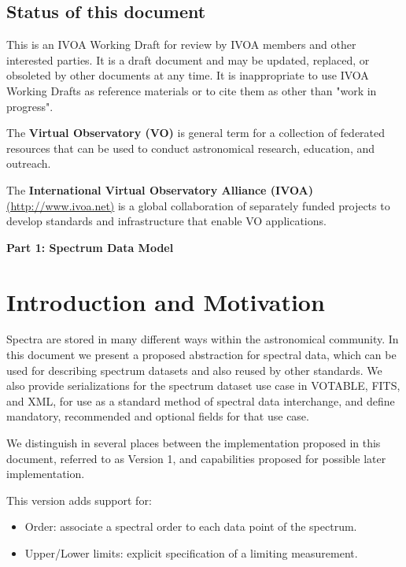 \documentclass[11pt]{article}
\newcommand{\htzero}{}
\newcommand{\htpart}[1]{\centerline{\bf #1}}
\begin{document}
\clearpage

\subsection*{ Status of this document }

This is an IVOA Working Draft for review by IVOA members and other interested parties.
It is a draft document and may be updated, replaced, or obsoleted by other documents at any time.
It is inappropriate to use IVOA Working Drafts as reference materials or to cite them as other than "work in progress".

The {\bf Virtual Observatory (VO)} is general term for a collection of
federated resources that can be used to conduct astronomical research,
education, and outreach. 

The {\bf International Virtual Observatory Alliance
(IVOA)} \url{(http://www.ivoa.net)} is a global collaboration of separately
funded projects to develop standards and infrastructure that enable VO
applications.

\clearpage

\tableofcontents

\newpage


\htzero

{\Large
\vfill
\htpart{Part 1: Spectrum Data Model}
\vfill
}
\newpage
\section{Introduction and Motivation}

Spectra are stored in many different ways within the astronomical
community. In this document we present a proposed abstraction for
spectral data, which can be used for describing spectrum datasets and
also reused by other standards. We also provide serializations for the
spectrum dataset use case in VOTABLE, FITS, and XML, for use as a
standard method of spectral data interchange, and define mandatory,
recommended and optional fields for that use case.

We distinguish in several places between the implementation proposed in
this document, referred to as Version 1, and capabilities proposed for
possible later implementation.

This version adds support for:
\begin{itemize}
  \item Order: associate a spectral order to each data point of the spectrum.
  \item Upper/Lower limits: explicit specification of a limiting measurement.
\end{itemize}
\end{document}
